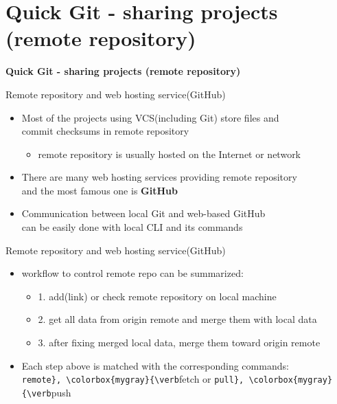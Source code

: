 \documentclass[11pt, xelatex]{beamer}
\newcommand{\bi}{\begin{itemize}}
\newcommand{\ei}{\end{itemize}}
\begin{document}
\section{Quick Git - sharing projects (remote repository)}
\begin{frame}
\Large
\centering
\textbf{Quick Git - sharing projects (remote repository)}
\end{frame}

\begin{frame}{Remote repository and web hosting service(GitHub)}
\bi
\item Most of the projects using VCS(including Git) store files and\\commit checksums in remote repository
    \bi
    \item remote repository is usually hosted on the Internet or network
    \ei
\item There are many web hosting services providing remote repository\\and the most famous one is \textbf{GitHub}
\item Communication between local Git and web-based GitHub\\can be easily done with local CLI and its commands
\ei
\end{frame}

\begin{frame}{Remote repository and web hosting service(GitHub)}
\bi
\item workflow to control remote repo can be summarized:
    \bi
    \item[1.] add(link) or check remote repository on local machine
    \item[2.] get all data from origin remote and merge them with local data
    \item[3.] after fixing merged local data, merge them toward origin remote
    \ei
\item Each step above is matched with the corresponding commands:\\\colorbox{mygray}{\verb|remote}, \colorbox{mygray}{\verb|fetch} or \colorbox{mygray}{\verb|pull}, \colorbox{mygray}{\verb|push}
\ei
\end{frame}
\end{document}

